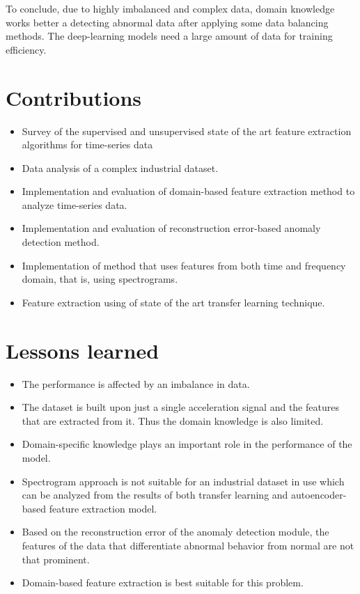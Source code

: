 	To conclude, due to highly imbalanced and complex data, domain knowledge works better a detecting abnormal data after applying some data balancing methods. The deep-learning models need a large amount of data for training efficiency.
	
	
	
	
	\section{Contributions}
	\begin{itemize}
		\item Survey of the supervised and unsupervised state of the art feature extraction algorithms for time-series data
		\item Data analysis of a complex industrial dataset.
		\item Implementation and evaluation of domain-based feature extraction method to analyze time-series data.
		\item Implementation and evaluation of reconstruction error-based anomaly detection method.
		\item Implementation of method that uses features from both time and frequency domain, that is, using spectrograms.
		\item Feature extraction using of state of the art transfer learning technique.
	\end{itemize}
	
	
	\section{Lessons learned}
	\begin{itemize}
		\item The performance is affected by an imbalance in data.
		\item The dataset is built upon just a single acceleration signal and the features that are extracted from it. Thus the domain knowledge is also limited.
		\item Domain-specific knowledge plays an important role in the performance of the model.
		\item Spectrogram approach is not suitable for an industrial dataset in use which can be analyzed from the results of both transfer learning and autoencoder-based feature extraction model.
		\item Based on the reconstruction error of the anomaly detection module, the features of the data that differentiate abnormal behavior from normal are not that prominent.
		\item Domain-based feature extraction is best suitable for this problem.
	\end{itemize}
	
